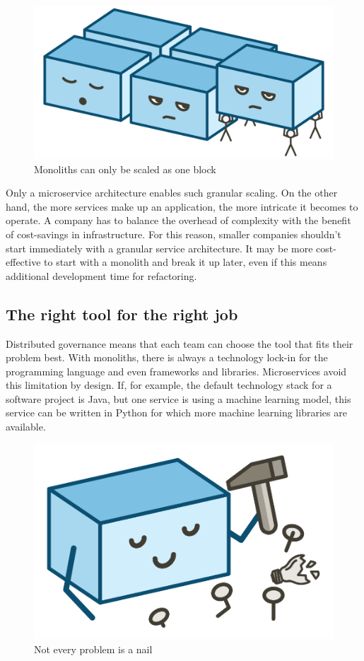 \begin{figure}[ht]
  \centering
  \includegraphics[width=0.55\linewidth]{assets/illustration-monolith-scaling.png}
  \caption{Monoliths can only be scaled as one block}
\end{figure}

Only a microservice architecture enables such granular scaling. On the other hand, the more services make up an application, the more intricate it becomes to operate. A company has to balance the overhead of complexity with the benefit of cost-savings in infrastructure. For this reason, smaller companies shouldn't start immediately with a granular service architecture. It may be more cost-effective to start with a monolith and break it up later, even if this means additional development time for refactoring.


\subsection{The right tool for the right job}

Distributed governance means that each team can choose the tool that fits their problem best. With monoliths, there is always a technology lock-in for the programming language and even frameworks and libraries. Microservices avoid this limitation by design. If, for example, the default technology stack for a software project is Java, but one service is using a machine learning model, this service can be written in Python for which more machine learning libraries are available.

\begin{figure}[ht]
  \centering
  \includegraphics[width=0.4\linewidth]{assets/illustration-monolith-hammer.png}
  \caption{Not every problem is a nail}
\end{figure}

